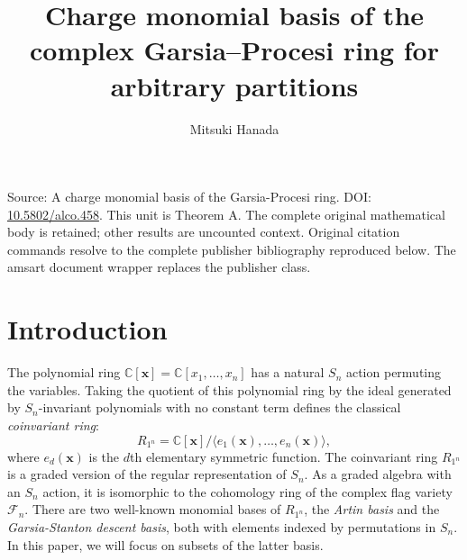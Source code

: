 \documentclass[10pt]{amsart}
\title[Human proof corpus 773]{Charge monomial basis of the complex Garsia–Procesi ring for arbitrary partitions}
\author{Mitsuki Hanada}
\theoremstyle{plain}
\theoremstyle{definition}
\theoremstyle{plain}
\theoremstyle{plain}
\theoremstyle{remark}
\theoremstyle{plain}
\theoremstyle{plain}
\begin{document}
\maketitle
\noindent Source: A charge monomial basis of the Garsia-Procesi ring. DOI: \href{https://doi.org/10.5802/alco.458}{10.5802/alco.458}. This unit is Theorem A. The complete original mathematical body is retained; other results are uncounted context. Original citation commands resolve to the complete publisher bibliography reproduced below. The amsart document wrapper replaces the publisher class.


\theoremstyle{plain} 

\newtheorem*{thm1}{Theorem A}
\newtheorem*{thm2}{Theorem B}
\newtheorem*{prop2}{Proposition C}
\newtheorem*{cor3}{Corollary D}
\newtheorem{axio}[cdrthm]{Axiom}

\theoremstyle{definition}
\newtheorem{alg}[cdrthm]{Algorithm}
\newtheorem{ex}[cdrthm]{Example}

\theoremstyle{remark}

\section{Introduction}
The polynomial ring $\mathbb{C}[\mathbf{x}] = \mathbb{C}[x_1,\dots, x_n]$ has a natural $S_n$ action permuting the variables. 
Taking the quotient of this polynomial ring by the ideal generated by $S_n$-invariant polynomials with no constant term defines the classical \textit{coinvariant ring}:
\[R_{1^n}= \mathbb{C}[\mathbf{x}]/\langle e_1(\mathbf{x}),\dots,  e_n(\mathbf{x})\rangle,\] where $e_d(\mathbf{x})$ is the $d$th elementary symmetric function. 
The coinvariant ring $R_{1^n}$ is a graded version of the regular representation of $S_n$.
As a graded algebra with an $S_n$ action, it is isomorphic to the cohomology ring of the complex flag variety $\mathcal{F}_n$. 
There are two well-known monomial bases of $R_{1^n}$, the \textit{Artin basis} and the \textit{Garsia-Stanton descent basis}, both with elements indexed by permutations in $S_n$. 
In this paper, we will focus on subsets of the latter basis. 
  
\end{document}
